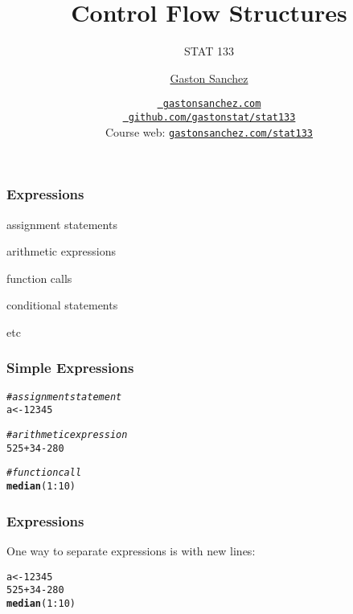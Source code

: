 \documentclass[12pt]{beamer}\usepackage[]{graphicx}\usepackage[]{color}
\title{Control Flow Structures}
\subtitle{STAT 133}
\author{\href{http://www.gastonsanchez.com}{Gaston Sanchez}}
\institute{Department of Statistics, UC{\textendash}Berkeley}
\date{\href{http://www.gastonsanchez.com}{\tt \scriptsize \color{foreground} gastonsanchez.com}
\\[-4pt]
\href{http://github.com/gastonstat/stat133}{\tt \scriptsize \color{foreground} github.com/gastonstat/stat133}
\\[-4pt]
{\scriptsize Course web: \href{http://www.gastonsanchez.com/stat133}{\tt gastonsanchez.com/stat133}}
}
\makeatletter
\newcommand{\hlnum}[1]{\textcolor[rgb]{0.686,0.059,0.569}{#1}}%
\newcommand{\hlcom}[1]{\textcolor[rgb]{0.678,0.584,0.686}{\textit{#1}}}%
\newcommand{\hlopt}[1]{\textcolor[rgb]{0,0,0}{#1}}%
\newcommand{\hlstd}[1]{\textcolor[rgb]{0.345,0.345,0.345}{#1}}%
\newcommand{\hlkwb}[1]{\textcolor[rgb]{0.69,0.353,0.396}{#1}}%
\newcommand{\hlkwd}[1]{\textcolor[rgb]{0.737,0.353,0.396}{\textbf{#1}}}%
\newenvironment{kframe}{%
 \def\at@end@of@kframe{}%
 \ifinner\ifhmode%
  \def\at@end@of@kframe{\end{minipage}}%
  \begin{minipage}{\columnwidth}%
 \fi\fi%
 \def\FrameCommand##1{\hskip\@totalleftmargin \hskip-\fboxsep
 \colorbox{shadecolor}{##1}\hskip-\fboxsep
     \hskip-\linewidth \hskip-\@totalleftmargin \hskip\columnwidth}%
 \MakeFramed {\advance\hsize-\width
   \@totalleftmargin\z@ \linewidth\hsize
   \@setminipage}}%
 {\par\unskip\endMakeFramed%
 \at@end@of@kframe}
\newenvironment{knitrout}{}{} %
\makeatother
\begin{document}
{
  \frame{
    \titlepage
  } 
}


\begin{frame}
\begin{center}
\Huge{}
\end{center}
\end{frame}


\begin{frame}[fragile]
\frametitle{Expressions}

\bbi
  \item assignment statements
  \item arithmetic expressions
  \item function calls
  \item conditional statements
  \item etc
\ei
\eb

\end{frame}


\begin{frame}[fragile]
\frametitle{Simple Expressions}
\begin{knitrout}\footnotesize
{}\color{fgcolor}\begin{kframe}
\begin{alltt}
\hlcom{# assignment statement}
\hlstd{a} \hlkwb{<-} \hlnum{12345}

\hlcom{# arithmetic expression}
\hlnum{525} \hlopt{+} \hlnum{34} \hlopt{-} \hlnum{280}

\hlcom{# function call}
\hlkwd{median}\hlstd{(}\hlnum{1}\hlopt{:}\hlnum{10}\hlstd{)}
\end{alltt}
\end{kframe}
\end{knitrout}
\end{frame}


\begin{frame}[fragile]
\frametitle{Expressions}

One way to separate expressions is with new lines:
\begin{knitrout}\footnotesize
{}\color{fgcolor}\begin{kframe}
\begin{alltt}
\hlstd{a} \hlkwb{<-} \hlnum{12345}
\hlnum{525} \hlopt{+} \hlnum{34} \hlopt{-} \hlnum{280}
\hlkwd{median}\hlstd{(}\hlnum{1}\hlopt{:}\hlnum{10}\hlstd{)}
\end{alltt}
\end{kframe}
\end{knitrout}

\end{frame}
\end{document}
